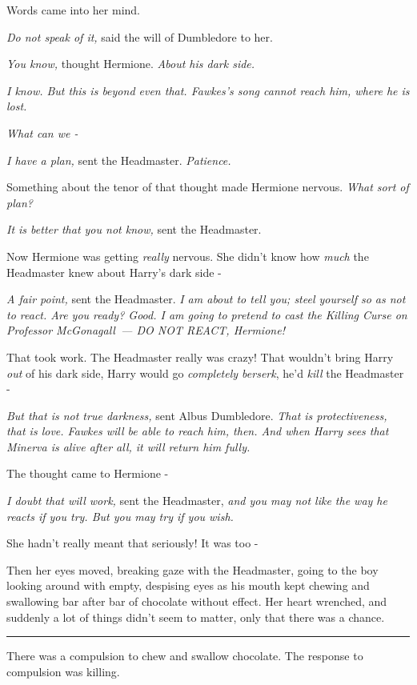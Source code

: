 Words came into her mind.

\emph{Do not speak of it,} said the will of Dumbledore to her.

\emph{You know,} thought Hermione. \emph{About his dark side.}

\emph{I know. But this is beyond even that. Fawkes's song cannot reach him, where he is lost.}

\emph{What can we -}

\emph{I have a plan,} sent the Headmaster. \emph{Patience.}

Something about the tenor of that thought made Hermione nervous. \emph{What sort of plan?}

\emph{It is better that you not know,} sent the Headmaster.

Now Hermione was getting \emph{really} nervous. She didn't know how \emph{much} the Headmaster knew about Harry's dark side -

\emph{A fair point,} sent the Headmaster. \emph{I am about to tell you; steel yourself so as not to react. Are you ready? Good. I am going to pretend to cast the Killing Curse on Professor McGonagall~--- DO NOT REACT, Hermione!}

That took work. The Headmaster really was crazy! That wouldn't bring Harry \emph{out} of his dark side, Harry would go \emph{completely berserk}, he'd \emph{kill} the Headmaster -

\emph{But that is not true darkness,} sent Albus Dumbledore. \emph{That is protectiveness, that is love. Fawkes will be able to reach him, then. And when Harry sees that Minerva is alive after all, it will return him fully.}

The thought came to Hermione -

\emph{I doubt that will work,} sent the Headmaster, \emph{and you may not like the way he reacts if you try. But you may try if you wish.}

She hadn't really meant that seriously! It was too -

Then her eyes moved, breaking gaze with the Headmaster, going to the boy looking around with empty, despising eyes as his mouth kept chewing and swallowing bar after bar of chocolate without effect. Her heart wrenched, and suddenly a lot of things didn't seem to matter, only that there was a chance.

\begin{center}\rule{3in}{0.4pt}\end{center}

There was a compulsion to chew and swallow chocolate. The response to compulsion was killing.

